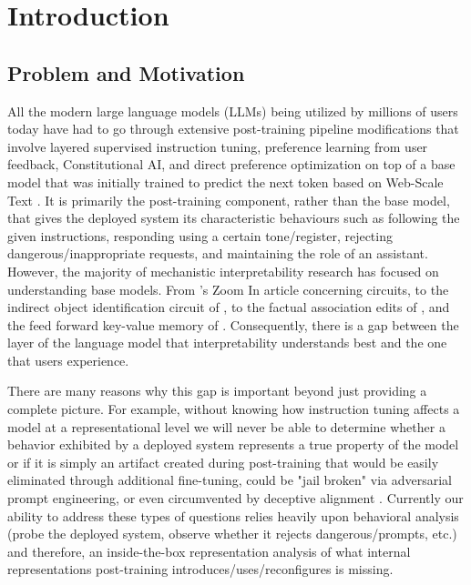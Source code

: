 \pagestyle{fancy}

\section{Introduction}
\label{sec:introduction}

\subsection{Problem and Motivation}
\label{sec:problem-motivation}

All the modern large language models (LLMs) being utilized by millions of users today have had to go through extensive post-training pipeline modifications that involve layered supervised instruction tuning, preference learning from user feedback, Constitutional AI, and direct preference optimization on top of a base model that was initially trained to predict the next token based on Web-Scale Text \parencite{christiano_deep_2023, ouyang_training_2022, ziegler_fine-tuning_2020, bai_constitutional_2022, rafailov_direct_2024}. It is primarily the post-training component, rather than the base model, that gives the deployed system its characteristic behaviours such as following the given instructions, responding using a certain tone/register, rejecting dangerous/inappropriate requests, and maintaining the role of an assistant. However, the majority of mechanistic interpretability research has focused on understanding base models. From \textcite{olah_zoom_2020}'s Zoom In article concerning circuits, to the indirect object identification circuit of \textcite{wang_interpretability_2022}, to the factual association edits of \textcite{meng_locating_2023}, and the feed forward key-value memory of \textcite{geva_transformer_2021}. Consequently, there is a gap between the layer of the language model that interpretability understands best and the one that users experience.

There are many reasons why this gap is important beyond just providing a complete picture. For example, without knowing how instruction tuning affects a model at a representational level we will never be able to determine whether a behavior exhibited by a deployed system represents a true property of the model or if it is simply an artifact created during post-training that would be easily eliminated through additional fine-tuning, could be "jail broken" via adversarial prompt engineering, or even circumvented by deceptive alignment \parencite{zou_universal_2023, hubinger_sleeper_2024}. Currently our ability to address these types of questions relies heavily upon behavioral analysis (probe the deployed system, observe whether it rejects dangerous/prompts, etc.) and therefore, an inside-the-box representation analysis of what internal representations post-training introduces/uses/reconfigures is missing.


